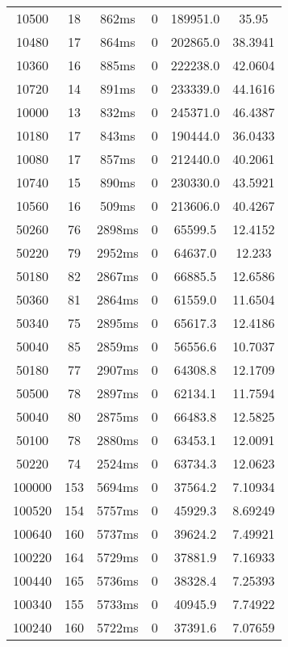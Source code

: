 \documentclass[./main.tex]{subfiles}
\begin{document}
\begin{table}
\begin{tabular}{ c | c | c | c | c | c }
        10500 & 18 & 862ms & 0 & 189951.0 & 35.95 \\
        10480 & 17 & 864ms & 0 & 202865.0 & 38.3941 \\
        10360 & 16 & 885ms & 0 & 222238.0 & 42.0604 \\
        10720 & 14 & 891ms & 0 & 233339.0 & 44.1616 \\
        10000 & 13 & 832ms & 0 & 245371.0 & 46.4387 \\
        10180 & 17 & 843ms & 0 & 190444.0 & 36.0433 \\
        10080 & 17 & 857ms & 0 & 212440.0 & 40.2061 \\
        10740 & 15 & 890ms & 0 & 230330.0 & 43.5921 \\
        \rowcolor{lightgray} 10560 & 16 & 509ms & 0 & 213606.0 & 40.4267 \\
        \hline
        50260 & 76 & 2898ms & 0 & 65599.5 & 12.4152 \\
        50220 & 79 & 2952ms & 0 & 64637.0 & 12.233 \\
        50180 & 82 & 2867ms & 0 & 66885.5 & 12.6586 \\
        50360 & 81 & 2864ms & 0 & 61559.0 & 11.6504 \\
        50340 & 75 & 2895ms & 0 & 65617.3 & 12.4186 \\
        50040 & 85 & 2859ms & 0 & 56556.6 & 10.7037 \\
        \rowcolor{lightgray} 50180 & 77 & 2907ms & 0 & 64308.8 & 12.1709 \\
        50500 & 78 & 2897ms & 0 & 62134.1 & 11.7594 \\
        50040 & 80 & 2875ms & 0 & 66483.8 & 12.5825 \\
        50100 & 78 & 2880ms & 0 & 63453.1 & 12.0091 \\
        50220 & 74 & 2524ms & 0 & 63734.3 & 12.0623 \\
        \hline
        100000 & 153 & 5694ms & 0 & 37564.2 & 7.10934 \\
        100520 & 154 & 5757ms & 0 & 45929.3 & 8.69249 \\
        100640 & 160 & 5737ms & 0 & 39624.2 & 7.49921 \\
        100220 & 164 & 5729ms & 0 & 37881.9 & 7.16933 \\
        \rowcolor{lightgray} 100440 & 165 & 5736ms & 0 & 38328.4 & 7.25393 \\
        100340 & 155 & 5733ms & 0 & 40945.9 & 7.74922 \\
        100240 & 160 & 5722ms & 0 & 37391.6 & 7.07659 \\

\end{tabular}
\end{table}
\end{document}
